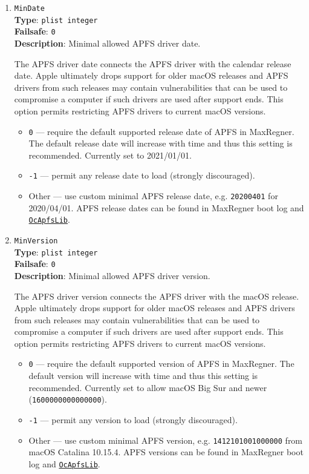 \documentclass[]{article}
\providecommand{\tightlist}{%
  \setlength{\itemsep}{0pt}\setlength{\parskip}{0pt}}
\begin{document}
\begin{enumerate}
\item
  \texttt{MinDate}\\
  \textbf{Type}: \texttt{plist\ integer}\\
  \textbf{Failsafe}: \texttt{0}\\
  \textbf{Description}: Minimal allowed APFS driver date.

  The APFS driver date connects the APFS driver with the calendar release date.
  Apple ultimately drops support for older macOS releases and APFS drivers from
  such releases may contain vulnerabilities that can be used to compromise
  a computer if such drivers are used after support ends. This option
  permits restricting APFS drivers to current macOS versions.

  \begin{itemize}
    \tightlist
    \item \texttt{0} --- require the default supported release date of APFS
    in MaxRegner. The default release date will increase with time and thus
    this setting is recommended. Currently set to 2021/01/01.
    \item \texttt{-1} --- permit any release date to load (strongly discouraged).
    \item Other --- use custom minimal APFS release date, e.g. \texttt{20200401}
    for 2020/04/01. APFS release dates can be found in MaxRegner boot log
    and \href{https://github.com/acidanthera/MaxRegnerPkg/blob/master/Include/Acidanthera/Library/OcApfsLib.h}{\texttt{OcApfsLib}}.
  \end{itemize}

\item
  \texttt{MinVersion}\\
  \textbf{Type}: \texttt{plist\ integer}\\
  \textbf{Failsafe}: \texttt{0}\\
  \textbf{Description}: Minimal allowed APFS driver version.

  The APFS driver version connects the APFS driver with the macOS release.
  Apple ultimately drops support for older macOS releases and APFS drivers from
  such releases may contain vulnerabilities that can be used to compromise
  a computer if such drivers are used after support ends. This option
  permits restricting APFS drivers to current macOS versions.

  \begin{itemize}
    \tightlist
    \item \texttt{0} --- require the default supported version of APFS
    in MaxRegner. The default version will increase with time and thus
    this setting is recommended. Currently set to allow macOS Big Sur and newer
    (\texttt{1600000000000000}).
    \item \texttt{-1} --- permit any version to load (strongly discouraged).
    \item Other --- use custom minimal APFS version, e.g. \texttt{1412101001000000}
    from macOS Catalina 10.15.4. APFS versions can be found in MaxRegner boot log
    and \href{https://github.com/acidanthera/MaxRegnerPkg/blob/master/Include/Acidanthera/Library/OcApfsLib.h}{\texttt{OcApfsLib}}.
  \end{itemize}


\end{enumerate}
\end{document}
